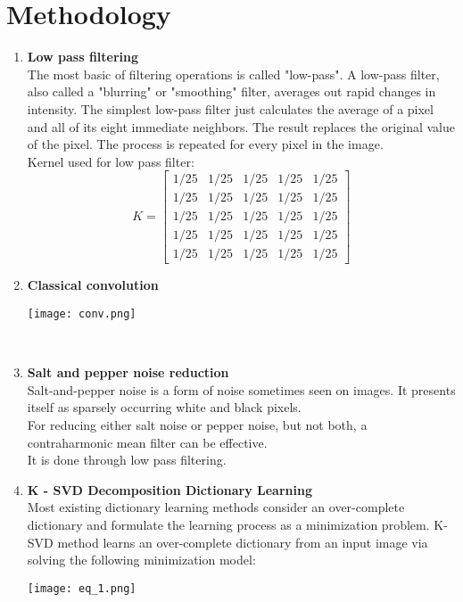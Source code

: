 \documentclass[journal]{IEEEtran}
\begin{document}
	
	\section{\textbf{Methodology}}
	\begin{enumerate}
	    \item \textbf{Low pass filtering}\\
	    The most basic of filtering operations is called "low-pass". A low-pass filter, also called a "blurring" or "smoothing" filter, averages out rapid changes in intensity. The simplest low-pass filter just calculates the average of a pixel and all of its eight immediate neighbors. The result replaces the original value of the pixel. The process is repeated for every pixel in the image.\\
	    Kernel used for low pass filter:\\
	    \[
  K=
  \left[ {\begin{array}{ccccc}
   1/25 & 1/25 & 1/25 & 1/25 & 1/25\\
   1/25 & 1/25 & 1/25 & 1/25 & 1/25\\
   1/25 & 1/25 & 1/25 & 1/25 & 1/25\\
   1/25 & 1/25 & 1/25 & 1/25 & 1/25\\
   1/25 & 1/25 & 1/25 & 1/25 & 1/25
  \end{array} } \right]
\]
	    \item \textbf{Classical convolution}\\
        \begin{minipage}{\linewidth}
    		\centering
    		\texttt{[image: conv.png]}
    		\\
	    \end{minipage}     	    \\
	    \item \textbf{Salt and pepper noise reduction}\\
	    Salt-and-pepper noise is a form of noise sometimes seen on images. It presents itself as sparsely occurring white and black pixels.\\
	    For reducing either salt noise or pepper noise, but not both, a contraharmonic mean filter can be effective.\\
	    It is done through low pass filtering.
	    \item \textbf{K - SVD Decomposition Dictionary Learning}\\
	    Most existing dictionary
learning methods consider an over-complete dictionary and
formulate the learning process as a minimization problem.
	    K-SVD method learns an over-complete dictionary from an
input image via solving the following minimization model:
        \begin{minipage}{\linewidth}
    		\centering
    		\texttt{[image: eq\_1.png]}
	    \end{minipage} 
	    


\end{enumerate}
\end{document}
